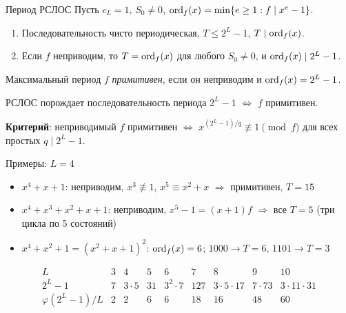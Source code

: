\documentclass{ca-slides}
\begin{document}
\begin{theoremframe}{Период РСЛОС}
  Пусть $c_L = 1$, $S_0 \ne 0$, $\operatorname{ord}_f(x) = \min\{e \ge 1 : f \mid x^e - 1\}$.
  \begin{enumerate}
    \item Последовательность чисто периодическая, $T \le 2^L - 1$, $T \mid \operatorname{ord}_f(x)$.
    \item Если $f$ неприводим, то $T = \operatorname{ord}_f(x)$ для любого $S_0 \ne 0$, и
      $\operatorname{ord}_f(x) \mid 2^L - 1$.
  \end{enumerate}
\end{theoremframe}

\begin{theoremframe}{Максимальный период}
  $f$ \emph{примитивен}, если он неприводим и $\operatorname{ord}_f(x) = 2^L - 1$.

  РСЛОС порождает последовательность периода $2^L - 1$ $\iff$ $f$ примитивен.

  \medskip
  \textbf{Критерий}: неприводимый $f$ примитивен $\iff$
  $x^{(2^L-1)/q} \not\equiv 1 \pmod f$ для всех простых $q \mid 2^L - 1$.
\end{theoremframe}

\begin{canvasframe}[shrink=10]{Примеры: $L = 4$}
  \begin{itemize}
    \item $x^4 + x + 1$: неприводим, $x^3 \not\equiv 1$, $x^5 \equiv x^2 + x$ $\Rightarrow$
      примитивен, $T = 15$
    \item $x^4 + x^3 + x^2 + x + 1$: неприводим, $x^5 - 1 = (x + 1) f$ $\Rightarrow$ все $T = 5$
      (три цикла по 5 состояний)
    \item $x^4 + x^2 + 1 = (x^2 + x + 1)^2$: $\operatorname{ord}_f(x) = 6$; $1000 \to T = 6$, $1101 \to T = 3$
  \end{itemize}
  \small
  \[
  \begin{array}{c|cccccccc}
    L & 3 & 4 & 5 & 6 & 7 & 8 & 9 & 10\\ \hline
    2^L - 1 & 7 & 3 \cdot 5 & 31 & 3^2 \cdot 7 & 127 & 3 \cdot 5 \cdot 17 & 7 \cdot 73 & 3 \cdot 11 \cdot 31\\
    \varphi(2^L - 1)/L & 2 & 2 & 6 & 6 & 18 & 16 & 48 & 60
  \end{array}
  \]
\end{canvasframe}
\end{document}
